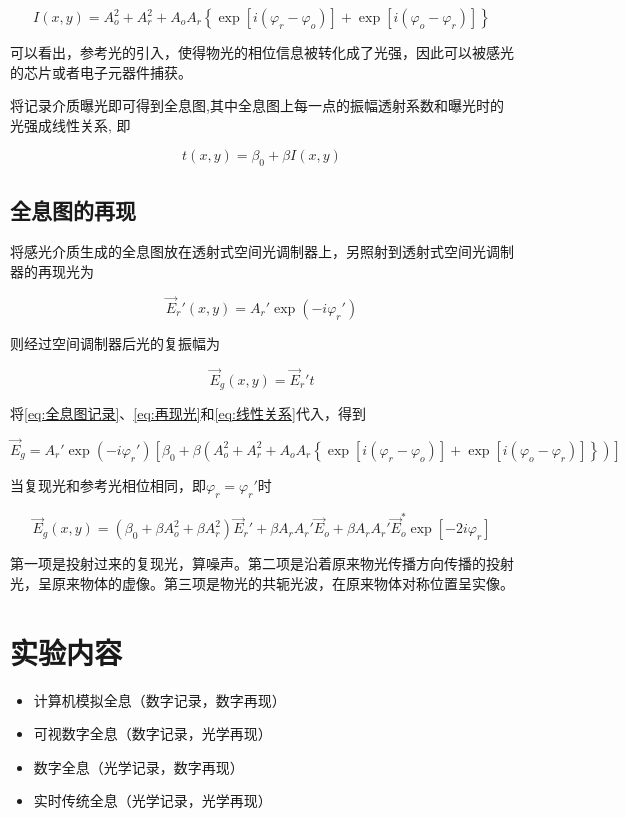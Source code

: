 \documentclass{article}
\begin{document}
\begin{equation}
  \label{eq:全息图记录}
  I \left( x, y \right) = A_o^2 + A_r^2 + A_o A_r \left\{ \exp \left[ i \left( \varphi_r - \varphi_o \right) \right] + \exp \left[ i \left( \varphi_o - \varphi_r \right) \right] \right\}
\end{equation}

可以看出，参考光的引入，使得物光的相位信息被转化成了光强，因此可以被感光的芯片或者电子元器件捕获。

将记录介质曝光即可得到全息图,其中全息图上每一点的振幅透射系数和曝光时的光强成线性关系,
即

\begin{equation}
  \label{eq:线性关系}
  t \left( x,y \right) = \beta_0 + \beta I \left( x, y \right)
\end{equation}

\subsection{全息图的再现}

将感光介质生成的全息图放在透射式空间光调制器上，另照射到透射式空间光调制器的再现光为

\begin{equation}
  \label{eq:再现光}
  \vec{E}_r' \left( x,y \right) = A_r' \exp \left( - i \varphi_r' \right)
\end{equation}

则经过空间调制器后光的复振幅为

\begin{equation}
  \label{eq:投射复振幅}
  \vec{E}_g \left( x,y \right) = \vec{E}_r' t
\end{equation}

将\ref{eq:全息图记录}、\ref{eq:再现光}和\ref{eq:线性关系}代入，得到

\begin{equation}
  \label{eq:全息再现}
  \vec{E}_g = A_r' \exp \left( - i \varphi_r' \right) \left[ \beta_0 + \beta \left( A_o^2 + A_r^2 + A_o A_r \left\{ \exp \left[ i \left( \varphi_r - \varphi_o \right) \right] + \exp \left[ i \left( \varphi_o - \varphi_r \right) \right] \right\} \right) \right]
\end{equation}

当复现光和参考光相位相同，即$\varphi_r = \varphi_r'$时

\begin{equation}
  \label{eq:复现光参考光相等}
  \vec{E}_g \left( x,y \right) = \left( \beta_0 + \beta A_o^2 + \beta A_r^2 \right) \vec{E}_r'
  + \beta A_r A_r' \vec{E}_o + \beta A_r A_r' \vec{E}_o^{*} \exp \left[ - 2 i \varphi_r \right]
\end{equation}

第一项是投射过来的复现光，算噪声。第二项是沿着原来物光传播方向传播的投射光，呈原来物体的虚像。第三项是物光的共轭光波，在原来物体对称位置呈实像。

\section{实验内容}

\begin{itemize}
\item 计算机模拟全息（数字记录，数字再现）
\item 可视数字全息（数字记录，光学再现）
\item 数字全息（光学记录，数字再现）
\item 实时传统全息（光学记录，光学再现）
\end{itemize}
\end{document}
